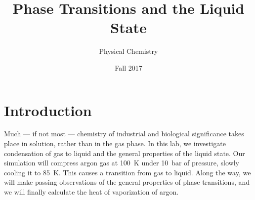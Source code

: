 \documentclass{article}
\title{Phase Transitions and the Liquid State}
\author{Physical Chemistry}
\date{Fall 2017}
\begin{document}
\maketitle
\tableofcontents

\section{Introduction}
Much — if not most — chemistry of industrial and biological significance takes place in solution, rather than in the gas phase.
In this lab, we investigate condensation of gas to liquid and the general properties of the liquid state.
Our simulation will compress argon gas at 100~K under 10~bar of pressure, slowly cooling it to 85~K.
This causes a transition from gas to liquid.
Along the way, we will make passing observations of the general properties of phase transitions, and we will finally calculate the heat of vaporization of argon.
\end{document}
